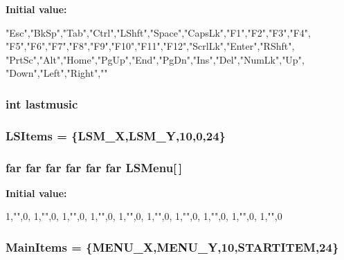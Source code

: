 \label{WL__MENU_8C_a4f10ad453385a6043f005a6cfb27519f}
{\bfseries Initial value:}
\begin{DoxyCode}
        
                                        {
        "Esc","BkSp","Tab","Ctrl","LShft","Space","CapsLk","F1","F2","F3","F4",
        "F5","F6","F7","F8","F9","F10","F11","F12","ScrlLk","Enter","RShft",
        "PrtSc","Alt","Home","PgUp","End","PgDn","Ins","Del","NumLk","Up",
        "Down","Left","Right",""
                                        }
\end{DoxyCode}
\hypertarget{WL__MENU_8C_ada3e1ba24dc039c28f508775f883731e}{
\subsubsection[{lastmusic}]{\setlength{\rightskip}{0pt plus 5cm}int {\bf lastmusic}}}
\label{WL__MENU_8C_ada3e1ba24dc039c28f508775f883731e}
\hypertarget{WL__MENU_8C_a34ddf48c23c11489c6b6a7a538eae0da}{
\subsubsection[{LSItems}]{ {\bf LSItems} = \{LSM\_\-X,LSM\_\-Y,10,0,24\}}}
\label{WL__MENU_8C_a34ddf48c23c11489c6b6a7a538eae0da}
\hypertarget{WL__MENU_8C_a2a2c5b1eed7ee351f0917f90135da14c}{
\subsubsection[{LSMenu}]{ far far far far far far {\bf LSMenu}\mbox{[}$\,$\mbox{]}}}
\label{WL__MENU_8C_a2a2c5b1eed7ee351f0917f90135da14c}
{\bfseries Initial value:}
\begin{DoxyCode}

{
        {1,"",0},
        {1,"",0},
        {1,"",0},
        {1,"",0},
        {1,"",0},
        {1,"",0},
        {1,"",0},
        {1,"",0},
        {1,"",0},
        {1,"",0}
}
\end{DoxyCode}
\hypertarget{WL__MENU_8C_a93c27abff0c41dacc4c91cba6616ebc8}{
\subsubsection[{MainItems}]{ {\bf MainItems} = \{MENU\_\-X,MENU\_\-Y,10,STARTITEM,24\}}}
